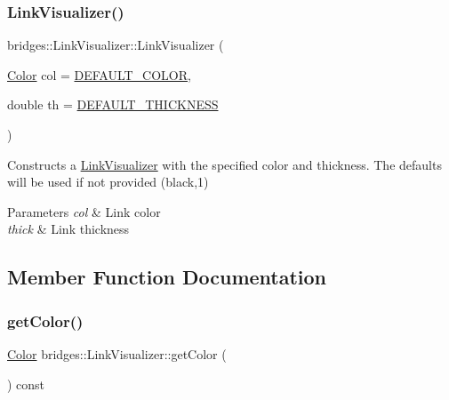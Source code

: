 \subsubsection{\texorpdfstring{Link\+Visualizer()}{LinkVisualizer()}}
{\footnotesize\ttfamily bridges\+::\+Link\+Visualizer\+::\+Link\+Visualizer (\begin{DoxyParamCaption}\item[{\mbox{\hyperlink{classbridges_1_1_color}{Color}}}]{col = {\ttfamily \mbox{\hyperlink{classbridges_1_1_link_visualizer_a7698ad5b243041377d81152a339d1282}{D\+E\+F\+A\+U\+L\+T\+\_\+\+C\+O\+L\+OR}}},  }\item[{double}]{th = {\ttfamily \mbox{\hyperlink{classbridges_1_1_link_visualizer_ab790c33080c769008114db34d5ec8950}{D\+E\+F\+A\+U\+L\+T\+\_\+\+T\+H\+I\+C\+K\+N\+E\+SS}}} }\end{DoxyParamCaption})\hspace{0.3cm}{\ttfamily [inline]}}

Constructs a \mbox{\hyperlink{classbridges_1_1_link_visualizer}{Link\+Visualizer}} with the specified color and thickness. The defaults will be used if not provided (black,1)


\begin{DoxyParams}{Parameters}
{\em col} & Link color \\
\hline
{\em thick} & Link thickness \\
\hline
\end{DoxyParams}


\subsection{Member Function Documentation}
\mbox{\label{classbridges_1_1_link_visualizer_a794ab99f7dc3ec9b27961e7f6072181a}} 
\subsubsection{\texorpdfstring{get\+Color()}{getColor()}}
{\footnotesize\ttfamily \mbox{\hyperlink{classbridges_1_1_color}{Color}} bridges\+::\+Link\+Visualizer\+::get\+Color (\begin{DoxyParamCaption}{ }\end{DoxyParamCaption}) const\hspace{0.3cm}{\ttfamily [inline]}}


